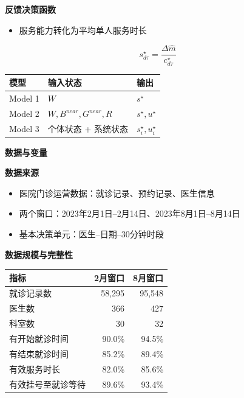 \documentclass[aspectratio=169,UTF8,zihao=-4]{ctexbeamer}
\newcommand{\bigidea}[1]{
  \begin{center}
    \vspace{0.8em}
    {\LARGE \bfseries #1}
    \vspace{0.6em}
  \end{center}
}
\newcommand{\sectionpageframe}[1]{
  \begin{frame}[plain]
    \begin{center}
      \vfill
      {\Huge \bfseries #1}
      \vfill
    \end{center}
  \end{frame}
}
\begin{document}
\begin{frame}
  \bigidea{反馈决策函数}
  \begin{itemize}
    \item \Large 服务能力转化为平均单人服务时长
  \end{itemize}
  \begin{center}
    {\Large
    \[
      s_{d\tau}^{\star}=\frac{\Delta\hat m}{c_{d\tau}^{\star}}
    \]
    }
  \end{center}
  \vspace{0.5em}
  \centering
  \large
  \begin{tabular}{lll}
    \toprule
    模型 & 输入状态 & 输出 \\
    \midrule
    Model 1 & $W$ & $s^\star$ \\
    Model 2 & $W,B^{near},G^{near},R$ & $s^\star,u^\star$ \\
    Model 3 & 个体状态 + 系统状态 & $s_i^\star,u_i^\star$ \\
    \bottomrule
  \end{tabular}
\end{frame}

\sectionpageframe{数据与变量}

\begin{frame}
  \bigidea{数据来源}
  \begin{itemize}
    \item \Large 医院门诊运营数据：就诊记录、预约记录、医生信息
    \item \Large 两个窗口：2023年2月1日--2月14日、2023年8月1日--8月14日
    \item \Large 基本决策单元：医生--日期--30分钟时段
  \end{itemize}
\end{frame}

\begin{frame}
  \bigidea{数据规模与完整性}
  \centering
  \large
  \setlength{\tabcolsep}{8pt}
  \begin{tabular}{lrr}
    \toprule
    指标 & 2月窗口 & 8月窗口 \\
    \midrule
    就诊记录数 & 58,295 & 95,548 \\
    医生数 & 366 & 427 \\
    科室数 & 30 & 32 \\
    有开始就诊时间 & 90.0\% & 94.5\% \\
    有结束就诊时间 & 85.2\% & 89.4\% \\
    有效服务时长 & 82.0\% & 85.6\% \\
    有效挂号至就诊等待 & 89.6\% & 93.4\% \\
    \bottomrule
  \end{tabular}
\end{frame}
\end{document}
